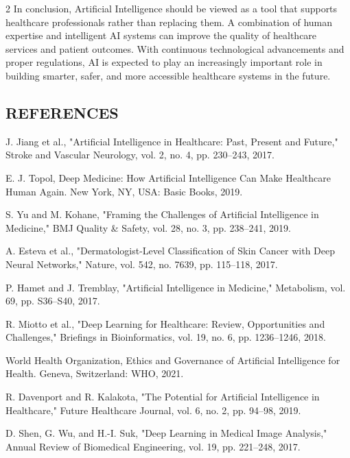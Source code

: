 \begin{multicols}{2}
\noindent
In conclusion, Artificial Intelligence should be viewed as a tool that supports healthcare professionals rather than replacing them. A combination of human expertise and intelligent AI systems can improve the quality of healthcare services and patient outcomes. With continuous technological advancements and proper regulations, AI is expected to play an increasingly important role in building smarter, safer, and more accessible healthcare systems in the future.

\subsection*{\centering\uppercase{References}}
{\small
\begin{justify}
\begin{enumerate}[
  label={[\arabic*]},
  leftmargin=*,
  labelsep=0.5em,
  itemsep=0.20em,
  parsep=0pt,
  topsep=0.15em
]
  \item J. Jiang et al., "Artificial Intelligence in Healthcare: Past, Present and Future," Stroke and Vascular Neurology, vol. 2, no. 4, pp. 230--243, 2017.
  \item E. J. Topol, Deep Medicine: How Artificial Intelligence Can Make Healthcare Human Again. New York, NY, USA: Basic Books, 2019.
  \item S. Yu and M. Kohane, "Framing the Challenges of Artificial Intelligence in Medicine," BMJ Quality \& Safety, vol. 28, no. 3, pp. 238--241, 2019.
  \item A. Esteva et al., "Dermatologist-Level Classification of Skin Cancer with Deep Neural Networks," Nature, vol. 542, no. 7639, pp. 115--118, 2017.
  \item P. Hamet and J. Tremblay, "Artificial Intelligence in Medicine," Metabolism, vol. 69, pp. S36--S40, 2017.
  \item R. Miotto et al., "Deep Learning for Healthcare: Review, Opportunities and Challenges," Briefings in Bioinformatics, vol. 19, no. 6, pp. 1236--1246, 2018.
  \item World Health Organization, Ethics and Governance of Artificial Intelligence for Health. Geneva, Switzerland: WHO, 2021.
  \item R. Davenport and R. Kalakota, "The Potential for Artificial Intelligence in Healthcare," Future Healthcare Journal, vol. 6, no. 2, pp. 94--98, 2019.
  \item D. Shen, G. Wu, and H.-I. Suk, "Deep Learning in Medical Image Analysis," Annual Review of Biomedical Engineering, vol. 19, pp. 221--248, 2017.

\end{enumerate}
\end{justify}}
\end{multicols}
